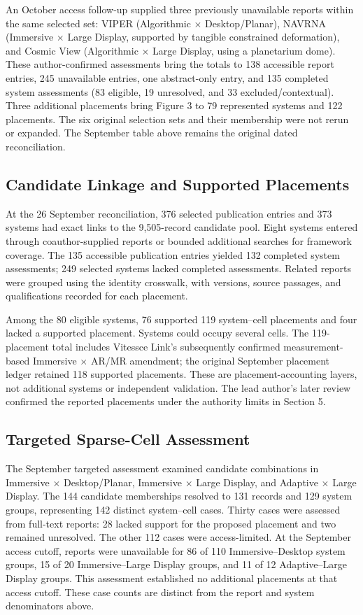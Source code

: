 \documentclass[11pt]{article}
\begin{document}
An October access follow-up supplied three previously unavailable reports within the same selected set: VIPER (Algorithmic $\times$ Desktop/Planar), NAVRNA (Immersive $\times$ Large Display, supported by tangible constrained deformation), and Cosmic View (Algorithmic $\times$ Large Display, using a planetarium dome).~\cite{NewVIPER1998,NewNAVRNA2006,NewCosmic2025} These author-confirmed assessments bring the totals to 138 accessible report entries, 245 unavailable entries, one abstract-only entry, and 135 completed system assessments (83 eligible, 19 unresolved, and 33 excluded/contextual). Three additional placements bring Figure 3 to 79 represented systems and 122 placements. The six original selection sets and their membership were not rerun or expanded. The September table above remains the original dated reconciliation.

\subsection{Candidate Linkage and Supported Placements}
At the 26 September reconciliation, 376 selected publication entries and 373 systems had exact links to the 9,505-record candidate pool. Eight systems entered through coauthor-supplied reports or bounded additional searches for framework coverage. The 135 accessible publication entries yielded 132 completed system assessments; 249 selected systems lacked completed assessments. Related reports were grouped using the identity crosswalk, with versions, source passages, and qualifications recorded for each placement.

Among the 80 eligible systems, 76 supported 119 system--cell placements and four lacked a supported placement. Systems could occupy several cells. The 119-placement total includes Vitessce Link's subsequently confirmed measurement-based Immersive $\times$ AR/MR amendment; the original September placement ledger retained 118 supported placements. These are placement-accounting layers, not additional systems or independent validation. The lead author's later review confirmed the reported placements under the authority limits in Section 5.

\subsection{Targeted Sparse-Cell Assessment}
The September targeted assessment examined candidate combinations in Immersive $\times$ Desktop/Planar, Immersive $\times$ Large Display, and Adaptive $\times$ Large Display. The 144 candidate memberships resolved to 131 records and 129 system groups, representing 142 distinct system--cell cases. Thirty cases were assessed from full-text reports: 28 lacked support for the proposed placement and two remained unresolved. The other 112 cases were access-limited. At the September access cutoff, reports were unavailable for 86 of 110 Immersive--Desktop system groups, 15 of 20 Immersive--Large Display groups, and 11 of 12 Adaptive--Large Display groups. This assessment established no additional placements at that access cutoff. These case counts are distinct from the report and system denominators above.
\end{document}
